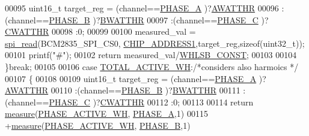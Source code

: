 \begin{DoxyCode}
00095                     uint16\_t target\_reg =  (channel==\hyperlink{a00043_ad214039f52b011ce2bd6c85ff98a981b}{PHASE\_A} )?\hyperlink{a00036_ae66c97ed86f47fd938f143a30a8b2f7e}{AWATTHR}
00096                                           :(channel==\hyperlink{a00043_ad7b96feed1e1c12515dad5e926b2c62e}{PHASE\_B} )?\hyperlink{a00036_a185c6910fa47f7e973f0f8743ef0e8ad}{BWATTHR}
00097                                           :(channel==\hyperlink{a00043_a3ceb83fb10c2af19b468d508448f24e2}{PHASE\_C} )?\hyperlink{a00036_ad685baf76950c0387bedffa9bb3272a9}{CWATTHR}
00098                                           :0;           
00099                                           
00100                     measured\_val = \hyperlink{a00007_ga7ad9f65ee46aca507374096506a0b1c4}{spi\_read}(BCM2835\_SPI\_CS0,
      \hyperlink{a00037_a94de2b046db6e10257ef4481c0a15eaa}{CHIP\_ADDRESS1},target\_reg,\textcolor{keyword}{sizeof}(uint32\_t));
00101                     printf(\textcolor{stringliteral}{"#"});
00102                     \textcolor{keywordflow}{return} measured\_val/\hyperlink{a00037_a75a052821a52067f93124e0c7ddcfdc3}{WHLSB\_CONST};
00103                 
00104                 \}\textcolor{keywordflow}{break};
00105                 
00106                 \textcolor{keywordflow}{case}  \hyperlink{a00043_ad8d2fc353ef124a8144e6d8264e43d1a}{TOTAL\_ACTIVE\_WH}:\textcolor{comment}{/*considers also harmoics */}
00107                 \{
00108                     
00109                     uint16\_t target\_reg =  (channel==\hyperlink{a00043_ad214039f52b011ce2bd6c85ff98a981b}{PHASE\_A} )?\hyperlink{a00036_ae66c97ed86f47fd938f143a30a8b2f7e}{AWATTHR}
00110                                           :(channel==\hyperlink{a00043_ad7b96feed1e1c12515dad5e926b2c62e}{PHASE\_B} )?\hyperlink{a00036_a185c6910fa47f7e973f0f8743ef0e8ad}{BWATTHR}
00111                                           :(channel==\hyperlink{a00043_a3ceb83fb10c2af19b468d508448f24e2}{PHASE\_C} )?\hyperlink{a00036_ad685baf76950c0387bedffa9bb3272a9}{CWATTHR}
00112                                           :0;           
00113                     
00114                      \textcolor{keywordflow}{return}  \hyperlink{a00009_gac914ebaa64afce03ee852af09659cf69}{measure}(\hyperlink{a00043_a4ee773ad07fa969b9990f9bb3a1a2093}{PHASE\_ACTIVE\_WH},
      \hyperlink{a00043_ad214039f52b011ce2bd6c85ff98a981b}{PHASE\_A},1)
00115                             +\hyperlink{a00009_gac914ebaa64afce03ee852af09659cf69}{measure}(\hyperlink{a00043_a4ee773ad07fa969b9990f9bb3a1a2093}{PHASE\_ACTIVE\_WH},
      \hyperlink{a00043_ad7b96feed1e1c12515dad5e926b2c62e}{PHASE\_B},1)

\end{DoxyCode}
